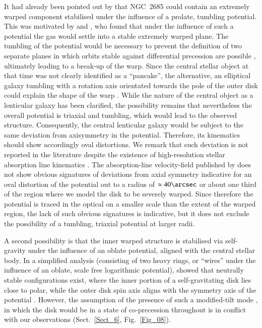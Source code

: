 \documentclass[oldversion]{aa}
\begin{document}
It had already been pointed out by \citet[][]{Simonson83} that NGC~2685
could contain an extremely warped component stabilised under the
influence of a prolate, tumbling potential. This was motivated by
\citet[][]{Tohline82} and \citet[][]{Albada82}, who found that under
the influence of such a potential the gas would settle into a stable
extremely warped plane. The tumbling of the potential would be
necessary to prevent the definition of two separate planes in which
orbits stable against differential precession are possible \citep[see
e.g.][]{Whitmore90,Reshetnikov94}, ultimately leading to a break-up of
the warp. Since the central stellar object at that time was not
clearly identified as a ``pancake'', the alternative, an elliptical
galaxy tumbling with a rotation axis orientated towards the pole of
the outer disk could explain the shape of the warp \citep[see
also][]{Varnas90,Peletier93,Bekki02}. While the nature of the central
object as a lenticular galaxy has been clarified, the possibility
remains that nevertheless the overall potential is triaxial and
tumbling, which would lead to the observed structure. Consequently,
the central lenticular galaxy would be subject to the same deviation
from axisymmetry in the potential. Therefore, its kinematics should
show accordingly oval distortions. We remark that such deviation is
not reported in the literature despite the existence of
high-resolution stellar absorption line kinematics
\citep[][]{Emsellem04}. The absorption-line velocity-field
published by \citet[][]{Emsellem04} does not show obvious signatures
of deviations from axial symmetry indicative for an oval distortion of
the potential out to a radius of $\approx 40\arcsec$ or about one third of
the region where we model the  disk to be severely
warped. Since therefore the potential is traced in the optical on a smaller scale than the extent of the warped region,
the lack of such obvious signatures is indicative, but it does not
exclude the possibility of a tumbling, triaxial potential at larger
radii.

A second possibility is that the inner warped structure is stabilised
via self-gravity under the influence of an oblate potential, aligned
with the central stellar body. In a simplified analysis (consisting of
two heavy rings, or ``wires'' under the influence of an oblate, scale
free logarithmic potential), \citet[][]{Sparke86} showed that
neutrally stable configurations exist, where the inner portion of a
self-gravitating disk lies close to polar, while the outer disk spin
axis aligns with the symmetry axis of the potential \citep[comparable
to Type II warps as defined by][]{Sparke88}. However, the assumption
of the presence of such a modified-tilt mode \citep[][]{Sparke88}, in
which the disk would be in a state of co-precession throughout is in
conflict with our observations (Sect.~\ref{Sect_6},
Fig.~\ref{Fig_08}).
\end{document}
